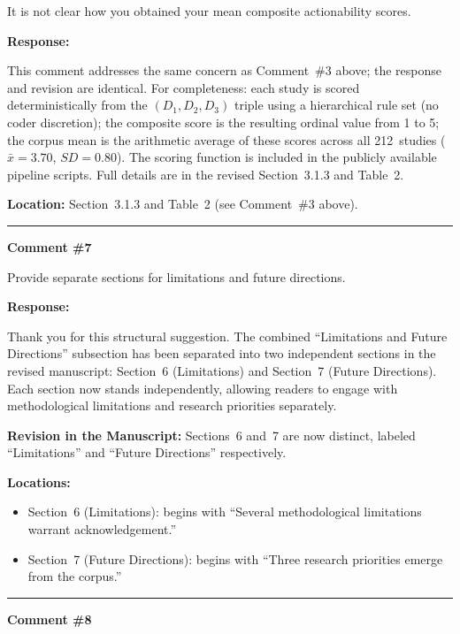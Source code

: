 \documentclass[12pt, a4paper]{article}
\begin{document}
\medskip
\noindent\textcolor{reviewerblue}{%
It is not clear how you obtained your mean composite actionability scores.}

\medskip
\noindent\textbf{Response:}

This comment addresses the same concern as Comment~\#3 above; the response and revision are
identical. For completeness: each study is scored deterministically from the $(D_1, D_2, D_3)$
triple using a hierarchical rule set (no coder discretion); the composite score is the resulting
ordinal value from 1 to 5; the corpus mean is the arithmetic average of these scores across all
212~studies ($\bar{x}=3.70$, $SD=0.80$). The scoring function is included in the publicly available
pipeline scripts. Full details are in the revised Section~3.1.3 and Table~2.

\medskip
\noindent\textbf{Location:} Section~3.1.3 and Table~2 (see Comment~\#3 above).

\bigskip\hrule\bigskip

\noindent\textbf{Comment \#7}

\medskip
\noindent\textcolor{reviewerblue}{%
Provide separate sections for limitations and future directions.}

\medskip
\noindent\textbf{Response:}

Thank you for this structural suggestion. The combined ``Limitations and Future Directions''
subsection has been separated into two independent sections in the revised manuscript:
Section~6 (Limitations) and Section~7 (Future Directions). Each section now stands independently,
allowing readers to engage with methodological limitations and research priorities separately.

\medskip
\noindent\textbf{Revision in the Manuscript:}
Sections~6 and~7 are now distinct, labeled ``Limitations'' and ``Future Directions'' respectively.

\medskip
\noindent\textbf{Locations:}
\begin{itemize}
  \item Section~6 (Limitations): begins with ``Several methodological limitations warrant
        acknowledgement.''
  \item Section~7 (Future Directions): begins with ``Three research priorities emerge from the
        corpus.''
\end{itemize}

\bigskip\hrule\bigskip

\noindent\textbf{Comment \#8}
\end{document}
